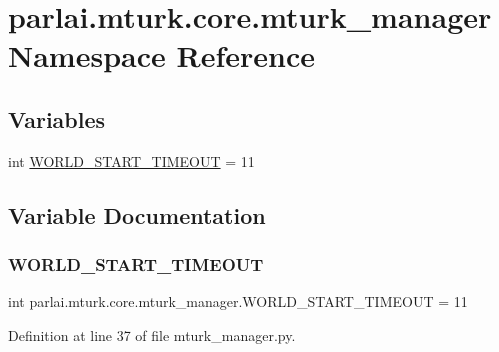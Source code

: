 \hypertarget{namespaceparlai_1_1mturk_1_1core_1_1mturk__manager}{}\section{parlai.\+mturk.\+core.\+mturk\+\_\+manager Namespace Reference}
\label{namespaceparlai_1_1mturk_1_1core_1_1mturk__manager}
\subsection*{Variables}
\begin{DoxyCompactItemize}
\item 
int \hyperlink{namespaceparlai_1_1mturk_1_1core_1_1mturk__manager_aec9348541dddbe7ce091e953bc5d7303}{W\+O\+R\+L\+D\+\_\+\+S\+T\+A\+R\+T\+\_\+\+T\+I\+M\+E\+O\+UT} = 11
\end{DoxyCompactItemize}


\subsection{Variable Documentation}
\mbox{\label{namespaceparlai_1_1mturk_1_1core_1_1mturk__manager_aec9348541dddbe7ce091e953bc5d7303}} 
\subsubsection{\texorpdfstring{W\+O\+R\+L\+D\+\_\+\+S\+T\+A\+R\+T\+\_\+\+T\+I\+M\+E\+O\+UT}{WORLD\_START\_TIMEOUT}}
{\footnotesize\ttfamily int parlai.\+mturk.\+core.\+mturk\+\_\+manager.\+W\+O\+R\+L\+D\+\_\+\+S\+T\+A\+R\+T\+\_\+\+T\+I\+M\+E\+O\+UT = 11}



Definition at line 37 of file mturk\+\_\+manager.\+py.

